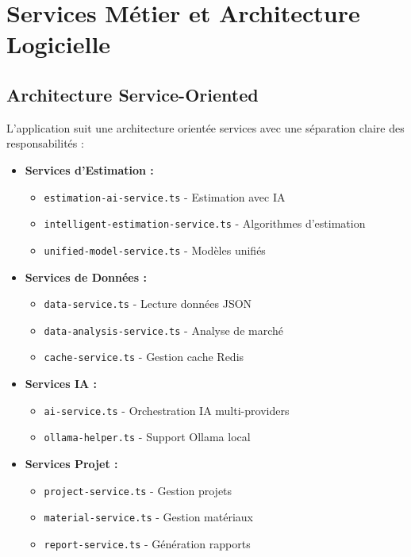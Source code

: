 
\section{Services Métier et Architecture Logicielle}

\subsection{Architecture Service-Oriented}

L'application suit une architecture orientée services avec une séparation claire des responsabilités :

\begin{itemize}
    \item \textbf{Services d'Estimation :}
    \begin{itemize}
        \item \texttt{estimation-ai-service.ts} - Estimation avec IA
        \item \texttt{intelligent-estimation-service.ts} - Algorithmes d'estimation
        \item \texttt{unified-model-service.ts} - Modèles unifiés
    \end{itemize}
    
    \item \textbf{Services de Données :}
    \begin{itemize}
        \item \texttt{data-service.ts} - Lecture données JSON
        \item \texttt{data-analysis-service.ts} - Analyse de marché
        \item \texttt{cache-service.ts} - Gestion cache Redis
    \end{itemize}
    
    \item \textbf{Services IA :}
    \begin{itemize}
        \item \texttt{ai-service.ts} - Orchestration IA multi-providers
        \item \texttt{ollama-helper.ts} - Support Ollama local
    \end{itemize}
    
    \item \textbf{Services Projet :}
    \begin{itemize}
        \item \texttt{project-service.ts} - Gestion projets
        \item \texttt{material-service.ts} - Gestion matériaux
        \item \texttt{report-service.ts} - Génération rapports
    \end{itemize}
\end{itemize}

